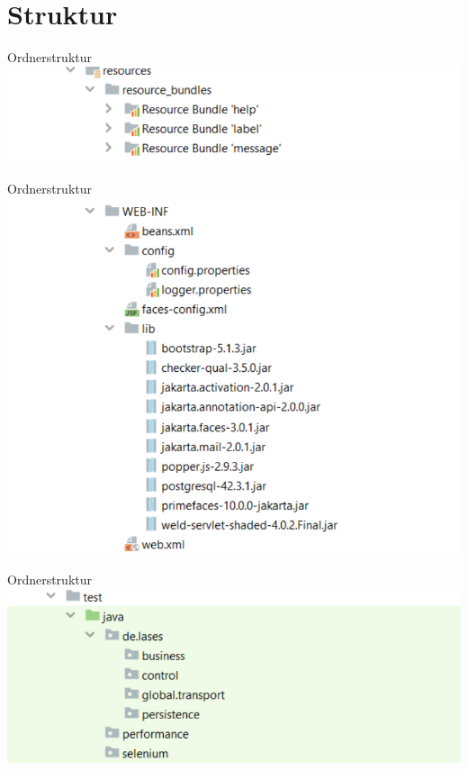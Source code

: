\documentclass{beamer}
\begin{document}
    \section{Struktur}
    \begin{frame}{Ordnerstruktur}
        \centering
        \includegraphics[height=0.4\textheight]{graphics/structure/folder_res}
    \end{frame}
    \begin{frame}{Ordnerstruktur}
        \centering
        \includegraphics[height=0.8\textheight]{graphics/structure/folder_web}
    \end{frame}
    \begin{frame}{Ordnerstruktur}
        \centering
        \includegraphics[height=0.7\textheight]{graphics/structure/folder_test}
    \end{frame}
\end{document}
